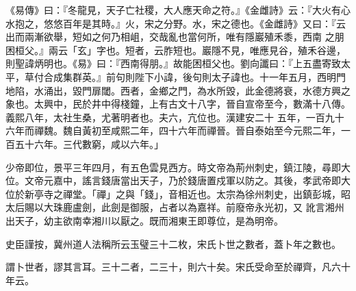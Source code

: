 \begin{pinyinscope}
 《易傳》曰：『冬龍見，天子亡社稷，大人應天命之符。』《金雌詩》云：『大火有心水抱之，悠悠百年是其時。』火，宋之分野。水，宋之德也。《金雌詩》又曰：『云出而兩漸欲舉，短如之何乃相岨，交哉亂也當何所，唯有隱巖殖禾黍，西南
 之朋困桓父。』兩云「玄」字也。短者，云胙短也。巖隱不見，唯應見谷，殖禾谷邊，則聖諱炳明也。《易》曰：『西南得朋。』故能困桓父也。劉向讖曰：『上五盡寄致太平，草付合成集群英。』前句則陛下小諱，後句則太子諱也。十一年五月，西明門地陷，水涌出，毀門扉閾。西者，金鄉之門，為水所毀，此金德將衰，水德方興之象也。太興中，民於井中得棧鐘，上有古文十八字，晉自宣帝至今，數滿十八傳。義熙八年，太社生桑，尤著明者也。夫六，亢位也。漢建安二十
 五年，一百九十六年而禪魏。魏自黃初至咸熙二年，四十六年而禪晉。晉自泰始至今元熙二年，一百五十六年。三代數窮，咸以六年。」



 少帝即位，景平三年四月，有五色雲見西方。時文帝為荊州刺史，鎮江陵，尋即大位。文帝元嘉中，謠言錢唐當出天子，乃於錢唐置戍軍以防之。其後，孝武帝即大位於新亭寺之禪堂。「禪」之與「錢」，音相近也。太宗為徐州刺史，出鎮彭城，昭太后賜以大珠鹿盧劍，此劍是御服，占者以為嘉祥。前廢帝永光初，又
 訛言湘州出天子，幼主欲南幸湘川以厭之。既而湘東王即尊位，是為明帝。



 史臣謹按，冀州道人法稱所云玉璧三十二枚，宋氏卜世之數者，蓋卜年之數也。



 謂卜世者，謬其言耳。三十二者，二三十，則六十矣。宋氏受命至於禪齊，凡六十年云。



\end{pinyinscope}
